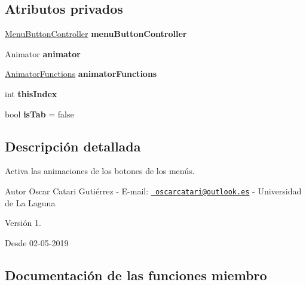 \subsection*{Atributos privados}
\begin{DoxyCompactItemize}
\item 
\mbox{\label{class_menu_button_ac51f366dac675dc93ed0b86d95c7158d}} 
\mbox{\hyperlink{class_menu_button_controller}{Menu\+Button\+Controller}} {\bfseries menu\+Button\+Controller}
\item 
\mbox{\label{class_menu_button_a0ee95efb09b41b4425cef7061de7ccde}} 
Animator {\bfseries animator}
\item 
\mbox{\label{class_menu_button_a39ab838425a9afd58b7c9321c8cd7137}} 
\mbox{\hyperlink{class_animator_functions}{Animator\+Functions}} {\bfseries animator\+Functions}
\item 
\mbox{\label{class_menu_button_a71f45b66791e5642a06f4e9af8348b97}} 
int {\bfseries this\+Index}
\item 
\mbox{\label{class_menu_button_af9d41fdb1f2d7fe041d01fc962e2352e}} 
bool {\bfseries is\+Tab} = false
\end{DoxyCompactItemize}


\subsection{Descripción detallada}
Activa las animaciones de los botones de los menús. \begin{DoxyAuthor}{Autor}
Oscar Catari Gutiérrez -\/ E-\/mail\+: \href{mailto:oscarcatari@outlook.es}{\texttt{ oscarcatari@outlook.\+es}} -\/ Universidad de La Laguna 
\end{DoxyAuthor}
\begin{DoxyVersion}{Versión}
1. 
\end{DoxyVersion}
\begin{DoxySince}{Desde}
02-\/05-\/2019 
\end{DoxySince}


\subsection{Documentación de las funciones miembro}
\mbox{\label{class_menu_button_ad2cf1b797001328270ffbc6f001627e5}} 
